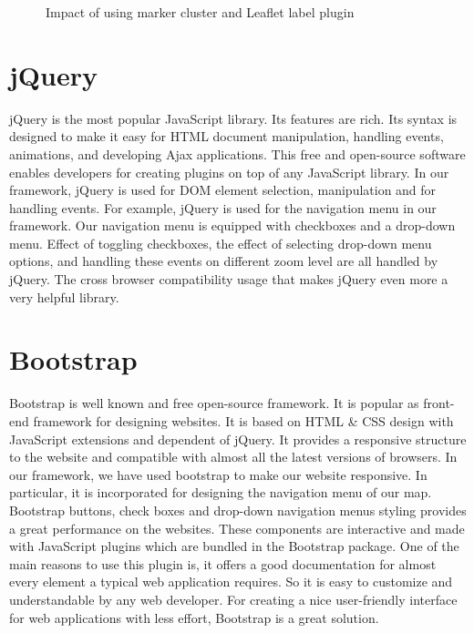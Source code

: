 \begin{figure}[H]
  \begin{center}
\hfill
{}
\hfill
\caption{Impact of using marker cluster and Leaflet label plugin}
\end{center}
\end{figure}

\section*{jQuery}

jQuery is the most popular JavaScript library. Its features are rich. Its syntax is designed to make it easy for HTML document manipulation, handling events, animations, and developing Ajax applications. This free and open-source software enables developers for creating plugins on top of any JavaScript library. In our framework, jQuery is used for DOM element selection, manipulation and for handling events. For example, jQuery is used for the navigation menu in our framework. Our navigation menu is equipped with checkboxes and a drop-down menu. Effect of toggling checkboxes, the effect of selecting drop-down menu options, and handling these events on different zoom level are all handled by jQuery. The cross browser compatibility usage that makes jQuery even more a very helpful library. 

\section*{Bootstrap}

Bootstrap is well known and free open-source framework. It is popular as front-end framework for designing websites. It is based on HTML \& CSS design with JavaScript extensions and dependent of jQuery. It provides a responsive structure to the website and compatible with almost all the latest versions of browsers. In our framework, we have used bootstrap to make our website responsive. In particular, it is incorporated for designing the navigation menu of our map.
Bootstrap buttons, check boxes and drop-down navigation menus styling provides a great performance on the websites. These components are interactive and made with JavaScript plugins which are bundled in the Bootstrap package. One of the main reasons to use this plugin is, it offers a good documentation for almost every element a typical web application requires. So it is easy to customize and understandable by any web developer. For creating a nice user-friendly interface for web applications with less effort, Bootstrap is a great solution.

